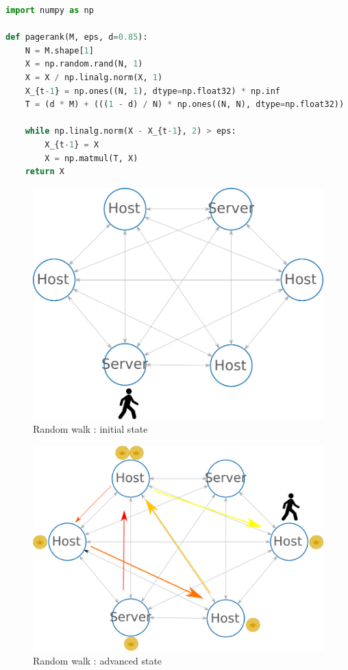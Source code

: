\documentclass[10pt,a4paper,oneside]{article}
\begin{document}
\begin{lstlisting}[language=Python, caption=Python Power Method]
import numpy as np

def pagerank(M, eps, d=0.85):
    N = M.shape[1]
    X = np.random.rand(N, 1)
    X = X / np.linalg.norm(X, 1)
    X_{t-1} = np.ones((N, 1), dtype=np.float32) * np.inf
    T = (d * M) + (((1 - d) / N) * np.ones((N, N), dtype=np.float32))
    
    while np.linalg.norm(X - X_{t-1}, 2) > eps: 
        X_{t-1} = X
        X = np.matmul(T, X)
    return X

\end{lstlisting}



\begin{figure}[!h]
\centering
\includegraphics[scale=0.5]{./images/PNG/GraphesRandomWalk.png}
\caption{Random walk : initial state}
\label{graphrwb}
\end{figure}

\begin{figure}[!h]
\centering
\includegraphics[scale=0.5]{./images/PNG/GraphesRandomWalk2.png}
\caption{Random walk : advanced state}
\label{graphrw}
\end{figure}
\end{document}
